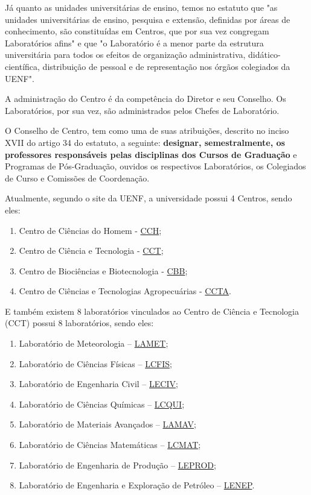 Já quanto as unidades universitárias de ensino, temos no estatuto que "as unidades universitárias de ensino, pesquisa e extensão, definidas por áreas de conhecimento, são constituídas em Centros, que por sua vez congregam Laboratórios afins" e que "o Laboratório é a menor parte da estrutura universitária para todos os efeitos de organização administrativa, didático-científica, distribuição de pessoal e de representação nos órgãos colegiados da UENF".

A administração do Centro é da competência do Diretor e seu Conselho. Os Laboratórios, por sua vez, são administrados pelos Chefes de Laboratório.

O Conselho de Centro, tem como uma de suas atribuições, descrito no inciso XVII do artigo 34 do estatuto, a seguinte: \textbf{designar, semestralmente, os professores responsáveis pelas disciplinas dos Cursos de Graduação} e Programas de Pós-Graduação, ouvidos os respectivos Laboratórios, os Colegiados de Curso e Comissões de Coordenação.

Atualmente, segundo o site da UENF, a universidade possui 4 Centros, sendo eles:

\begin{enumerate}
  \item Centro de Ciências do Homem - \href{https://uenf.br/}{CCH};
  \item Centro de Ciência e Tecnologia - \href{https://uenf.br/cct/}{CCT};
  \item Centro de Biociências e Biotecnologia - \href{https://uenf.br/}{CBB};
  \item Centro de Ciências e Tecnologias Agropecuárias - \href{https://uenf.br/}{CCTA}.
\end{enumerate}

E também existem 8 laboratórios vinculados ao Centro de Ciência e Tecnologia (CCT) possui 8 laboratórios, sendo eles:

\begin{enumerate}
  \item Laboratório de Meteorologia – \href{https://uenf.br/cct/administracao/laboratorios/}{LAMET};
  \item Laboratório de Ciências Físicas – \href{https://uenf.br/cct/lcmat/}{LCFIS};
  \item Laboratório de Engenharia Civil – \href{https://uenf.br/cct/administracao/laboratorios/}{LECIV};
  \item Laboratório de Ciências Químicas – \href{https://uenf.br/cct/administracao/laboratorios/}{LCQUI};
  \item Laboratório de Materiais Avançados – \href{https://uenf.br/cct/administracao/laboratorios/}{LAMAV};
  \item Laboratório de Ciências Matemáticas – \href{https://uenf.br/cct/administracao/laboratorios/}{LCMAT};
  \item Laboratório de Engenharia de Produção – \href{https://uenf.br/cct/administracao/laboratorios/}{LEPROD};
  \item Laboratório de Engenharia e Exploração de Petróleo – \href{https://uenf.br/cct/administracao/laboratorios/}{LENEP}.
\end{enumerate}

